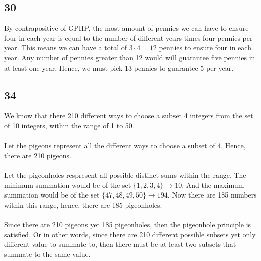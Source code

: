 \documentclass[12pt]{article}
\begin{document}
\subsection*{30}
By contrapositive of GPHP, the most amount of pennies we can have to ensure four in each year is equal to the number of different years times four pennies per year. This means we can have a total of $3\cdot4=12$ pennies to ensure four in each year. Any number of pennies greater than 12 would will guarantee five pennies in at least one year. Hence, we must pick 13 pennies to guarantee 5 per year.

\newpage
\subsection*{34}
We know that there 210 different ways to choose a subset 4 integers from the set of 10 integers, within the range of 1 to 50. 
\\ \\
Let the pigeons represent all the different ways to choose a subset of 4. Hence, there are 210 pigeons.
\\ \\
Let the pigeonholes respresent all possible distinct sums within the range. The minimum summation would be of the set $\{1,2,3,4\}\rightarrow10$. And the maximum summation would be of the set $\{47, 48, 49, 50\}\rightarrow 194$. Now there are 185 numbers within this range, hence, there are 185 pigeonholes.
\\ \\
Since there are 210 pigeons yet 185 pigeonholes, then the pigeonhole principle is satisfied. Or in other words, since there are 210 different possible subsets yet only different value to summate to, then there must be at least two subsets that summate to the same value.
\end{document}
